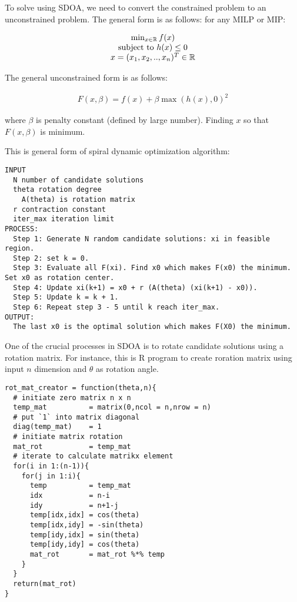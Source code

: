 \documentclass[
]{article}
\begin{document}
To solve using SDOA, we need to convert the constrained problem to an
unconstrained problem. The general form is as follows: for any MILP or
MIP:

\begin{align}
\begin{matrix} 
\min_{x \in \mathbb{R}} f(x) \\
\text{subject to } \space h(x) \leq 0 \\
x = (x_1,x_2,..,x_n)^T \in \mathbb{R}
\end{matrix}
\end{align}

The general unconstrained form is as follows:

\begin{align}
F(x,\beta) = f(x) + \beta \max(h(x),0)^2
\end{align}

where \(\beta\) is penalty constant (defined by large number). Finding
\(x\) so that \(F(x,\beta)\) is minimum.

This is general form of spiral dynamic optimization algorithm:

\begin{verbatim}
INPUT
  N number of candidate solutions
  theta rotation degree
    A(theta) is rotation matrix
  r contraction constant
  iter_max iteration limit
PROCESS:
  Step 1: Generate N random candidate solutions: xi in feasible region. 
  Step 2: set k = 0.
  Step 3: Evaluate all F(xi). Find x0 which makes F(x0) the minimum. Set x0 as rotation center.
  Step 4: Update xi(k+1) = x0 + r (A(theta) (xi(k+1) - x0)).
  Step 5: Update k = k + 1.
  Step 6: Repeat step 3 - 5 until k reach iter_max.
OUTPUT:
  The last x0 is the optimal solution which makes F(X0) the minimum.
\end{verbatim}

One of the crucial processes in SDOA is to rotate candidate solutions
using a rotation matrix. For instance, this is R program to create
roration matrix using input \(n\) dimension and \(\theta\) as rotation
angle.

\begin{verbatim}
rot_mat_creator = function(theta,n){
  # initiate zero matrix n x n
  temp_mat          = matrix(0,ncol = n,nrow = n)
  # put `1` into matrix diagonal
  diag(temp_mat)    = 1
  # initiate matrix rotation
  mat_rot           = temp_mat
  # iterate to calculate matrikx element
  for(i in 1:(n-1)){
    for(j in 1:i){
      temp          = temp_mat
      idx           = n-i
      idy           = n+1-j
      temp[idx,idx] = cos(theta)
      temp[idx,idy] = -sin(theta)
      temp[idy,idx] = sin(theta)
      temp[idy,idy] = cos(theta)
      mat_rot       = mat_rot %*% temp
    }
  }
  return(mat_rot)
}
\end{verbatim}
\end{document}

